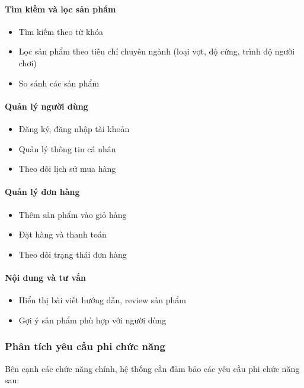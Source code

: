 \documentclass[13pt]{article}
\begin{document}
\paragraph{Tìm kiếm và lọc sản phẩm}
\begin{itemize}
    \item Tìm kiếm theo từ khóa
    \item Lọc sản phẩm theo tiêu chí chuyên ngành (loại vợt, độ cứng, trình độ người chơi)
    \item So sánh các sản phẩm
\end{itemize}

\paragraph{Quản lý người dùng}
\begin{itemize}
    \item Đăng ký, đăng nhập tài khoản
    \item Quản lý thông tin cá nhân
    \item Theo dõi lịch sử mua hàng
\end{itemize}

\paragraph{Quản lý đơn hàng}
\begin{itemize}
    \item Thêm sản phẩm vào giỏ hàng
    \item Đặt hàng và thanh toán
    \item Theo dõi trạng thái đơn hàng
\end{itemize}

\paragraph{Nội dung và tư vấn}
\begin{itemize}
    \item Hiển thị bài viết hướng dẫn, review sản phẩm
    \item Gợi ý sản phẩm phù hợp với người dùng
\end{itemize}

\subsubsection{Phân tích yêu cầu phi chức năng}

Bên cạnh các chức năng chính, hệ thống cần đảm bảo các yêu cầu phi chức năng sau:
\end{document}
